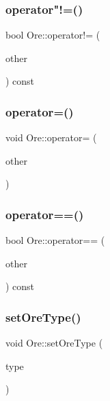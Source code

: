 \subsubsection{\texorpdfstring{operator"!=()}{operator!=()}}
{\footnotesize\ttfamily bool Ore\+::operator!= (\begin{DoxyParamCaption}\item[{const \mbox{\hyperlink{class_ore}{Ore}} \&}]{other }\end{DoxyParamCaption}) const}

\mbox{\label{class_ore_ab7fc14ea7982fa6a40c8f5408899bfba}} 
\subsubsection{\texorpdfstring{operator=()}{operator=()}}
{\footnotesize\ttfamily void Ore\+::operator= (\begin{DoxyParamCaption}\item[{const \mbox{\hyperlink{class_ore}{Ore}} \&}]{other }\end{DoxyParamCaption})}

\mbox{\label{class_ore_a1264f907e235e2fd60e0c6ba5f7778dd}} 
\subsubsection{\texorpdfstring{operator==()}{operator==()}}
{\footnotesize\ttfamily bool Ore\+::operator== (\begin{DoxyParamCaption}\item[{const \mbox{\hyperlink{class_ore}{Ore}} \&}]{other }\end{DoxyParamCaption}) const}

\mbox{\label{class_ore_a7d463e3c3da27da5a4e645c8ea062251}} 
\subsubsection{\texorpdfstring{set\+Ore\+Type()}{setOreType()}}
{\footnotesize\ttfamily void Ore\+::set\+Ore\+Type (\begin{DoxyParamCaption}\item[{\mbox{\hyperlink{_ore_8hpp_a4dd6f8b19eecee73049dd69be5803f14}{En\+Ore\+Type}}}]{type }\end{DoxyParamCaption})}

